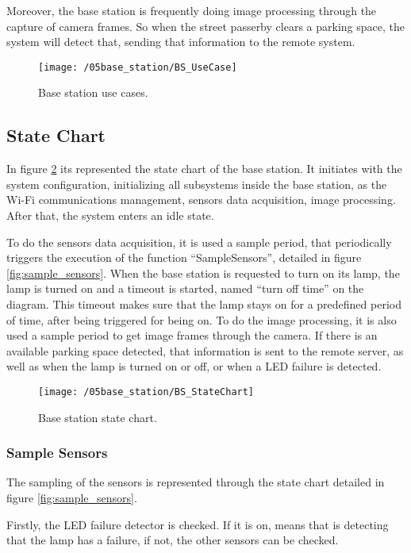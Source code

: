 Moreover, the base station is frequently doing image processing through the capture of camera frames. So when the street passerby clears a parking space, the system will detect that, sending that information to the remote system.

\begin{figure}[ht] 
	\centering
	\texttt{[image: /05base\_station/BS\_UseCase]}
	\caption{Base station use cases.}
	\label{fig:bs_use_cases}
\end{figure}

\subsection{State Chart}
In figure \ref{fig:bs_state_chart} its represented the state chart of the base station. It initiates with the system configuration, initializing all subsystems inside the base station, as the Wi-Fi communications management, sensors data acquisition, image processing. After that, the system enters an idle state.

To do the sensors data acquisition, it is used a sample period, that periodically triggers the execution of the function “SampleSensors”, detailed in figure \ref{fig:sample_sensors}. When the base station is requested to turn on its lamp, the lamp is turned on and a timeout is started, named “turn off time” on the diagram. This timeout makes sure that the lamp stays on for a predefined period of time, after being triggered for being on. To do the image processing, it is also used a sample period to get image frames through the camera. If there is an available parking space detected, that information is sent to the remote server, as well as when the lamp is turned on or off, or when a LED failure is detected.

\begin{figure}[ht]
	\centering
	\texttt{[image: /05base\_station/BS\_StateChart]}
	\caption{Base station state chart.}
	\label{fig:bs_state_chart}
\end{figure}

\clearpage
\subsubsection{Sample Sensors}
The sampling of the sensors is represented through the state chart detailed in figure \ref{fig:sample_sensors}.

Firstly, the LED failure detector is checked. If it is on, means that is detecting that the lamp has a failure, if not, the other sensors can be checked.


